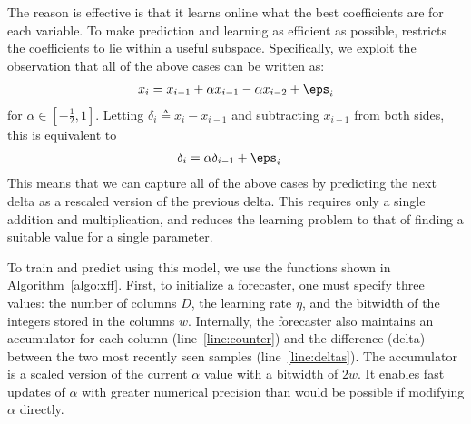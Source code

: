 The reason \fire is effective is that it learns online what the best coefficients are for each variable.
To make prediction and learning as efficient as possible, \justfire \text{} restricts the coefficients to lie within a useful subspace. Specifically, we exploit the observation that all of the above cases can be written as:
\begin{align}
    x_i = x_{i-1} + \alpha x_{i-1} - \alpha x_{i-2} + \eps_i
\end{align}
for $\alpha \in [-\frac{1}{2}, 1]$. Letting $\delta_i \triangleq x_i - x_{i-1}$ and subtracting $x_{i-1}$ from both sides, this is equivalent to
\begin{align}
    \delta_i &= \alpha \delta_{i-1} + \eps_i
\end{align}
This means that we can capture all of the above cases by predicting the next delta as a rescaled version of the previous delta. This requires only a single addition and multiplication, and reduces the learning problem to that of finding a suitable value for a single parameter.


To train and predict using this model, we use the functions shown in Algorithm~\ref{algo:xff}. First, to initialize a \fire forecaster, one must specify three values: the number of columns $D$, the learning rate $\eta$, and the bitwidth of the integers stored in the columns $w$. Internally, the forecaster also maintains an accumulator for each column (line~\ref{line:counter}) and the difference (delta) between the two most recently seen samples (line~\ref{line:deltas}). The accumulator is a scaled version of the current $\alpha$ value with a bitwidth of $2w$. It enables fast updates of $\alpha$ with greater numerical precision than would be possible if modifying $\alpha$ directly. %

